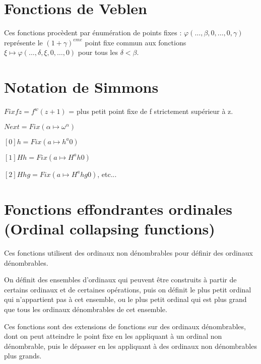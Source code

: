 \documentclass[8pt]{article}
\begin{document}
\section{Fonctions de Veblen}
\vspace{-0.4cm}
Ces fonctions procèdent par énumération de points fixes : \(\varphi(\ldots,\beta,0,\ldots,0,\gamma) \) représente le \((1+\gamma)^{eme}\) point fixe commun aux fonctions \( \xi \mapsto \varphi(\ldots,\delta,\xi,0,\ldots,0)\) pour tous les \(\delta < \beta\).
\vspace{-0.6cm}

\section{Notation de Simmons}
\vspace{-0.4cm}
\( Fix f z = f^w(z+1)\) = plus petit point fixe de f strictement supérieur à z.

\( Next = Fix (\alpha \mapsto \omega^\alpha) \)

\( [0] h = Fix (a \mapsto h^a 0) \)

\( [1] H h = Fix (a \mapsto H^a h 0) \)

\( [2] H h g = Fix (a \mapsto H^a h g 0) \), etc...

\vspace{-0.6cm}

\section{Fonctions effondrantes ordinales (Ordinal collapsing functions)}
\vspace{-0.4cm}
Ces fonctions utilisent des ordinaux non dénombrables pour définir des ordinaux dénombrables. 

On définit des ensembles d'ordinaux qui peuvent être construits à partir de certains ordinaux et de certaines opérations, puis on définit le plus petit ordinal qui n'appartient pas à cet ensemble, ou le plus petit ordinal qui est plus grand que tous les ordinaux dénombrables de cet ensemble.

Ces fonctions sont des extensions de fonctions sur des ordinaux dénombrables, dont on peut atteindre le point fixe en les appliquant à un ordinal non dénombrable, puis le dépasser en les appliquant à des ordinaux non dénombrables plus grands.
\end{document}
